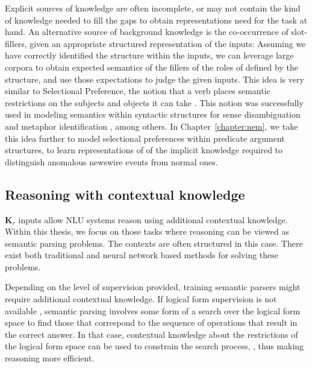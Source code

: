 Explicit sources of knowledge are often incomplete, or may not contain the kind of knowledge needed
to fill the gaps to obtain representations need for the task at hand.  An alternative source of
background knowledge is the co-occurrence of slot-fillers, given an appropriate structured
representation of the inputs: Assuming we have correctly identified the structure within the inputs,
we can leverage large corpora to obtain expected semantics of the fillers of the roles of defined by
the structure, and use those expectations to judge the given inputs.  This idea is very similar to
Selectional Preference, the notion that a verb places semantic restrictions on the subjects and
objects it can take \citep{katz1963structure,wilks1975preferential}.  This notion was successfully
used in modeling semantics within syntactic structures for sense disambiguation
\citep{resnik1997selectional} and metaphor identification \citep{shutova2013statistical}, among
others.  In Chapter~\ref{chapter:nem}, we take this idea further to model selectional preferences
within predicate argument structures, to learn representations of of the implicit knowledge required
to distinguish anomalous newswire events from normal ones.

\subsection{Reasoning with contextual knowledge} $\textbf{K}_r$ inputs allow NLU systems reason
using additional contextual knowledge. Within this thesis, we focus on those tasks where reasoning
can be viewed as semantic parsing problems.  The contexts are often structured in this case. There
exist both traditional \citep[among
others]{Zelle1996LearningTP,Zettlemoyer2005LearningTM,zettlemoyer2007online} and neural network
based methods
\citep{Dong2016LanguageTL,Andreas2016LearningTC,Liang2016NeuralSM,Neelakantan2016LearningAN} for
solving these problems. 

Depending on the level of supervision provided, training semantic parsers might require additional
contextual knowledge. If logical form supervision is not available
\citep{berant2013semantic,pasupat2015compositional,krishnamurthy2017neural}, semantic parsing
involves some form of a search over the logical form space to find those that correspond to the
sequence of operations that result in the correct answer.  In that case, contextual knowledge about
the restrictions of the logical form space can be used to constrain the search process,
\citep{xiao2016sequence,krishnamurthy2017neural}, thus making reasoning more efficient.

